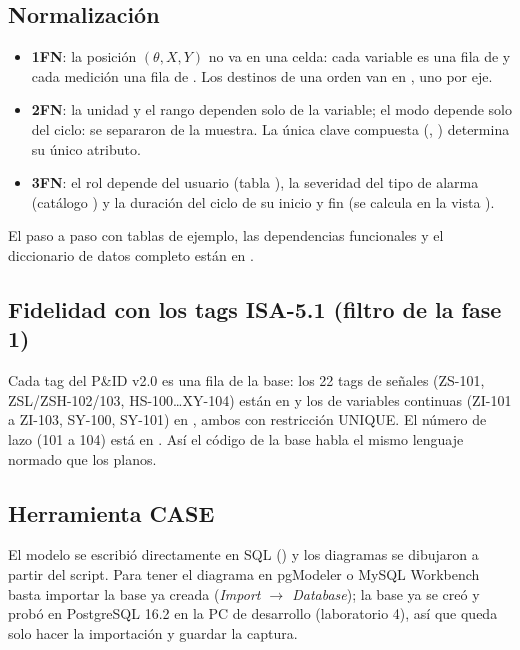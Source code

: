 \documentclass[a4paper,11pt]{article}
\begin{document}
\subsection{Normalización}
\begin{itemize}
\item \textbf{1FN}: la posición $(\theta, X, Y)$ no va en una celda: cada variable es una fila de  y cada medición una fila de . Los destinos de una orden van en , uno por eje.
\item \textbf{2FN}: la unidad y el rango dependen solo de la variable; el modo depende solo del ciclo: se separaron de la muestra. La única clave compuesta (, ) determina su único atributo.
\item \textbf{3FN}: el rol depende del usuario (tabla ), la severidad del tipo de alarma (catálogo ) y la duración del ciclo de su inicio y fin (se calcula en la vista ).
\end{itemize}
El paso a paso con tablas de ejemplo, las dependencias funcionales y el diccionario de datos completo están en .

\subsection{Fidelidad con los tags ISA-5.1 (filtro de la fase 1)}
Cada tag del P\&ID v2.0 es una fila de la base: los 22 tags de señales (ZS-101, ZSL/ZSH-102/103, HS-100\dots XY-104) están en  y los de variables continuas (ZI-101 a ZI-103, SY-100, SY-101) en , ambos con restricción UNIQUE. El número de lazo (101 a 104) está en . Así el código de la base habla el mismo lenguaje normado que los planos.

\subsection{Herramienta CASE}
El modelo se escribió directamente en SQL () y los diagramas se dibujaron a partir del script. Para tener el diagrama en pgModeler o MySQL Workbench basta importar la base ya creada (\emph{Import $\to$ Database}); la base ya se creó y probó en PostgreSQL 16.2 en la PC de desarrollo (laboratorio 4), así que queda solo hacer la importación y guardar la captura.
\end{document}
